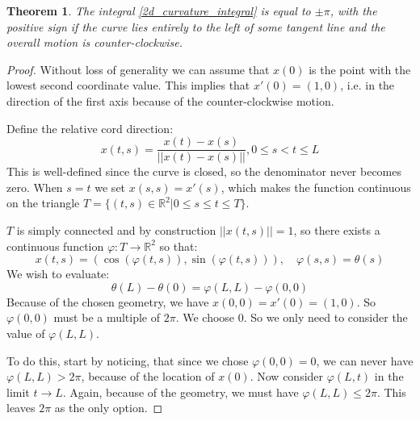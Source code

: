 \documentclass[12pt, a4paper]{article}
\newtheorem{theorem}{Theorem}[section]
\numberwithin{equation}{section}
\begin{document}
\begin{theorem}
The integral \ref{2d_curvature_integral} is equal to $\pm \pi$, with the positive sign if the curve lies entirely to the left of some tangent line and the overall motion is counter-clockwise.
\end{theorem}
\begin{proof}
Without loss of generality we can assume that $x(0)$ is the point with the lowest second coordinate value. This implies that $x'(0)=(1,0)$, i.e. in the direction of the first axis because of the counter-clockwise motion.

Define the relative cord direction:
\begin{equation}
x(t,s)=\frac{x(t)-x(s)}{||x(t)-x(s)||}, 0\le s<t\le L
\end{equation}
This is well-defined since the curve is closed, so the denominator never becomes zero. When $s=t$ we set $x(s,s)=x'(s)$, which makes the function continuous on the triangle $T=\{(t,s)\in\mathbb{R}^2|0\le s\le t\le T\}$.

$T$ is simply connected and by construction $||x(t,s)||=1$, so there exists a continuous function $\varphi: T\rightarrow\mathbb{R}^2$ so that:
\begin{equation}
x(t,s)=(\cos(\varphi(t,s)),\sin(\varphi(t,s))),\quad\varphi(s,s)=\theta(s)
\end{equation}
We wish to evaluate:
\begin{equation}
\theta(L)-\theta(0)=\varphi(L,L)-\varphi(0,0)
\end{equation}
Because of the chosen geometry, we have $x(0, 0)=x'(0)=(1,0)$. So $\varphi(0,0)$ must be a multiple of $2\pi$. We choose 0. So we only need to consider the value of $\varphi(L,L)$.

To do this, start by noticing, that since we chose $\varphi(0,0)=0$, we can never have $\varphi(L,L)>2\pi$, because of the location of $x(0)$. Now consider $\varphi(L,t)$ in the limit $t\rightarrow L$. Again, because of the geometry, we must have $\varphi(L,L)\le 2\pi$. This leaves $2\pi$ as the only option.
\end{proof}
\end{document}
